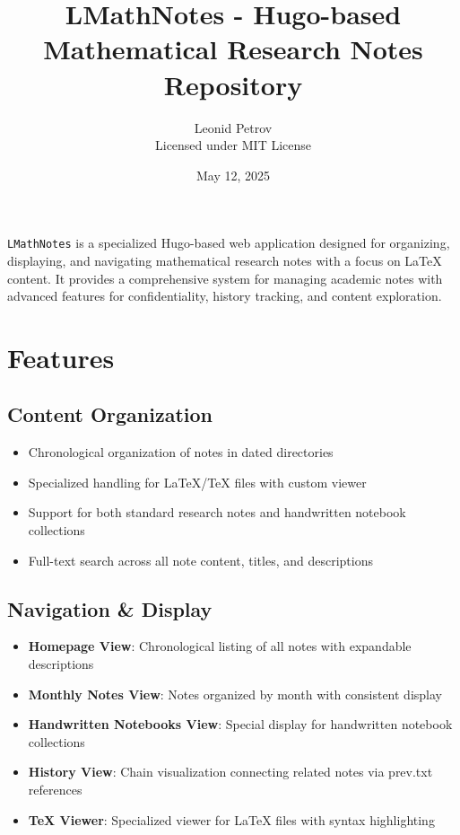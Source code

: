 \documentclass{article}
\title{LMathNotes - Hugo-based Mathematical Research Notes Repository}
\author{Leonid Petrov \\ \small{Licensed under MIT License}}
\date{May 12, 2025}
\begin{document}
\maketitle

\texttt{LMathNotes} is a specialized Hugo-based web application designed for organizing, displaying, and navigating mathematical research notes with a focus on LaTeX content. It provides a comprehensive system for managing academic notes with advanced features for confidentiality, history tracking, and content exploration.

\section{Features}

\subsection{Content Organization}
\begin{itemize}
  \item Chronological organization of notes in dated directories
  \item Specialized handling for LaTeX/TeX files with custom viewer
  \item Support for both standard research notes and handwritten notebook collections
  \item Full-text search across all note content, titles, and descriptions
\end{itemize}

\subsection{Navigation \& Display}
\begin{itemize}
  \item \textbf{Homepage View}: Chronological listing of all notes with expandable descriptions
  \item \textbf{Monthly Notes View}: Notes organized by month with consistent display
  \item \textbf{Handwritten Notebooks View}: Special display for handwritten notebook collections
  \item \textbf{History View}: Chain visualization connecting related notes via prev.txt references
  \item \textbf{TeX Viewer}: Specialized viewer for LaTeX files with syntax highlighting
\end{itemize}
\end{document}
